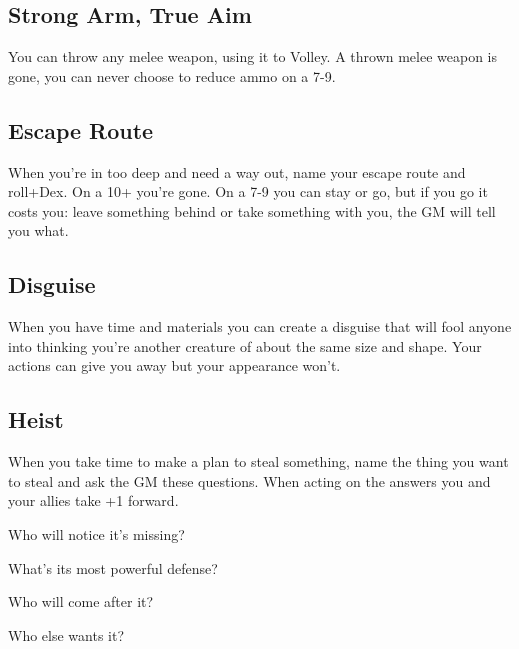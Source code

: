  
\subsection{Strong Arm, True Aim}      
 

You can throw any melee weapon, using it to Volley. A thrown melee weapon is gone, you can never choose to reduce ammo on a 7-9.

 
\subsection{Escape Route}    
 

When you're in too deep and need a way out, name your escape route and roll+Dex. On a 10+ you're gone. On a 7-9 you can stay or go, but if you go it costs you: leave something behind or take something with you, the GM will tell you what.

 
\subsection{Disguise}   
 

When you have time and materials you can create a disguise that will fool anyone into thinking you're another creature of about the same size and shape. Your actions can give you away but your appearance won't.

 
\subsection{Heist}   
 

When you take time to make a plan to steal something, name the thing you want to steal and ask the GM these questions. When acting on the answers you and your allies take +1 forward.

 
\startitemize[1,packed]

\item Who will notice it's missing?

 
\item What's its most powerful defense?

 
\item Who will come after it?

 
\item Who else wants it?


\stopitemize








 
